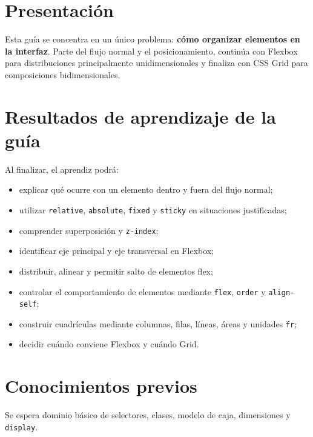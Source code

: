 \documentclass[11pt]{article}
\begin{document}
\thispagestyle{firstpage}
\GuideHeader
{}

\section{Presentación}
Esta guía se concentra en un único problema: \textbf{cómo organizar elementos en la interfaz}. Parte del flujo normal y el posicionamiento, continúa con Flexbox para distribuciones principalmente unidimensionales y finaliza con CSS Grid para composiciones bidimensionales.

\section*{Resultados de aprendizaje de la guía}
Al finalizar, el aprendiz podrá:
\begin{itemize}
    \item explicar qué ocurre con un elemento dentro y fuera del flujo normal;
    \item utilizar \texttt{relative}, \texttt{absolute}, \texttt{fixed} y \texttt{sticky} en situaciones justificadas;
    \item comprender superposición y \texttt{z-index};
    \item identificar eje principal y eje transversal en Flexbox;
    \item distribuir, alinear y permitir salto de elementos flex;
    \item controlar el comportamiento de elementos mediante \texttt{flex}, \texttt{order} y \texttt{align-self};
    \item construir cuadrículas mediante columnas, filas, líneas, áreas y unidades \texttt{fr};
    \item decidir cuándo conviene Flexbox y cuándo Grid.
\end{itemize}

\section*{Conocimientos previos}
Se espera dominio básico de selectores, clases, modelo de caja, dimensiones y \texttt{display}.

\end{document}
